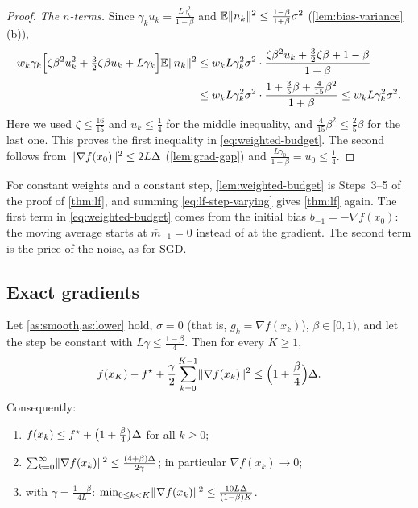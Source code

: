 \begin{proof}
\emph{The $n$-terms.} Since $\gamma_ku_k=\frac{L\gamma_k^2}{1-\beta}$ and
$\mathbb{E}\lVert n_k\rVert^2\le\frac{1-\beta}{1+\beta}\sigma^2$ (\cref{lem:bias-variance}(b)),
\begin{align*}
  w_k\gamma_k\Bigl[\zeta\beta^2u_k^2+\tfrac32\zeta\beta u_k+L\gamma_k\Bigr]\mathbb{E}\lVert n_k\rVert^2
  &\le w_kL\gamma_k^2\sigma^2\cdot\frac{\zeta\beta^2u_k+\frac32\zeta\beta+1-\beta}{1+\beta}\\
  &\le w_kL\gamma_k^2\sigma^2\cdot\frac{1+\frac35\beta+\frac4{15}\beta^2}{1+\beta}
  \le w_kL\gamma_k^2\sigma^2 .
\end{align*}
Here we used $\zeta\le\frac{16}{15}$ and $u_k\le\frac14$ for the middle inequality, and
$\frac4{15}\beta^2\le\frac25\beta$ for the last one. This proves the first inequality in
\eqref{eq:weighted-budget}. The second follows from $\lVert \nabla f(x_0)\rVert^2\le2L\Delta$
(\cref{lem:grad-gap}) and $\frac{L\gamma_0}{1-\beta}=u_0\le\frac14$.
\end{proof}

For constant weights and a constant step, \cref{lem:weighted-budget} is Steps~3--5 of the
proof of \cref{thm:lf}, and summing \eqref{eq:lf-step-varying} gives \cref{thm:lf} again. The
first term in \eqref{eq:weighted-budget} comes from the initial bias
$b_{-1}=-\nabla f(x_0)$: the moving average starts at $\bar m_{-1}=0$ instead of at the
gradient. The second term is the price of the noise, as for SGD.

\subsection{Exact gradients}

\begin{corollary}\label{cor:lf-deterministic}
Let \cref{as:smooth,as:lower} hold, $\sigma=0$ (that is, $g_k=\nabla f(x_k)$), $\beta\in[0,1)$,
and let the step be constant with $L\gamma\le\frac{1-\beta}{4}$. Then for every $K\ge1$,
\[
  f(x_K)-f^\star+\frac\gamma2\sum_{k=0}^{K-1}\lVert \nabla f(x_k)\rVert^2\le\Bigl(1+\frac\beta4\Bigr)\Delta .
\]
Consequently:
\begin{enumerate}[label=\textup{(\roman*)}]
\item $f(x_k)\le f^\star+\bigl(1+\frac\beta4\bigr)\Delta$ for all $k\ge0$;
\item $\sum_{k=0}^\infty\lVert \nabla f(x_k)\rVert^2\le\frac{(4+\beta)\Delta}{2\gamma}$; in particular $\nabla f(x_k)\to0$;
\item with $\gamma=\frac{1-\beta}{4L}$: $\min_{0\le k<K}\lVert \nabla f(x_k)\rVert^2\le\frac{10L\Delta}{(1-\beta)K}$.
\end{enumerate}
\end{corollary}

